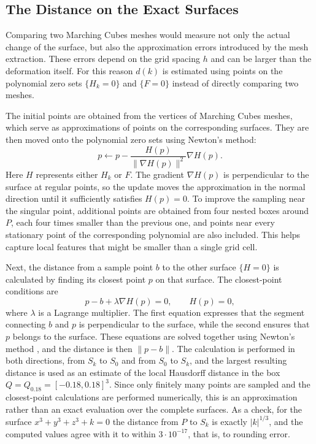 \documentclass[12pt, a4paper, oneside]{book}
\theoremstyle{plain}
\theoremstyle{definition}
\theoremstyle{remark}
\theoremstyle{definition}
\begin{document}
\subsection{The Distance on the Exact Surfaces}

Comparing two Marching Cubes meshes would measure not only the actual change of the surface, but also the approximation errors introduced by the mesh extraction. These errors depend on the grid spacing $h$ and can be larger than the deformation itself. For this reason $d(k)$ is estimated using points on the polynomial zero sets $\{H_k=0\}$ and $\{F=0\}$ instead of directly comparing two meshes.

The initial points are obtained from the vertices of Marching Cubes meshes, which serve as approximations of points on the corresponding surfaces. They are then moved onto the polynomial zero sets using Newton's method:
\[
p\leftarrow p-\frac{H(p)}{\|\nabla H(p)\|^2}\nabla H(p).
\]
Here $H$ represents either $H_k$ or $F$. The gradient $\nabla H(p)$ is perpendicular to the surface at regular points, so the update moves the approximation in the normal direction until it sufficiently satisfies $H(p)=0$. To improve the sampling near the singular point, additional points are obtained from four nested boxes around $P$, each four times smaller than the previous one, and points near every stationary point of the corresponding polynomial are also included. This helps capture local features that might be smaller than a single grid cell.

Next, the distance from a sample point $b$ to the other surface $\{H=0\}$ is calculated by finding its closest point $p$ on that surface. The closest-point conditions are
\[
p-b+\lambda\nabla H(p)=0,\qquad H(p)=0,
\]
where $\lambda$ is a Lagrange multiplier. The first equation expresses that the segment connecting $b$ and $p$ is perpendicular to the surface, while the second ensures that $p$ belongs to the surface. These equations are solved together using Newton's method \cite{nocedal2006numerical}, and the distance is then $\|p-b\|$. The calculation is performed in both directions, from $S_k$ to $S_0$ and from $S_0$ to $S_k$, and the largest resulting distance is used as an estimate of the local Hausdorff distance in the box $Q=Q_{0.18}=[-0.18,0.18]^3$. Since only finitely many points are sampled and the closest-point calculations are performed numerically, this is an approximation rather than an exact evaluation over the complete surfaces. As a check, for the surface $x^3+y^3+z^3+k=0$ the distance from $P$ to $S_k$ is exactly $|k|^{1/3}$, and the computed values agree with it to within $3\cdot10^{-17}$, that is, to rounding error.
\end{document}
